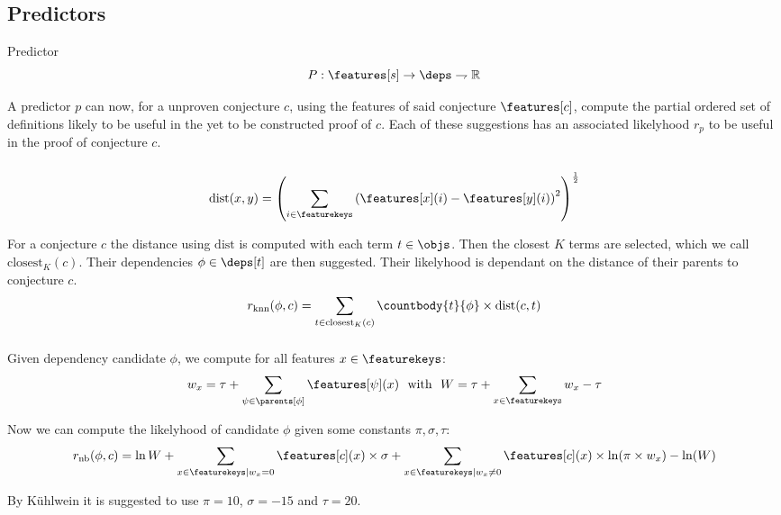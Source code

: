 \subsection{Predictors}

\begin{definition}{Predictor}
	\[ P : \features[s] \rightarrow \deps \rightharpoondown \mathbb{R} \]
\end{definition}

A predictor $p$ can now, for a unproven conjecture $c$,
using the features of said conjecture $\features[c]$,
compute the partial ordered set of definitions likely to be useful in the yet to be constructed proof of $c$.
Each of these suggestions has an associated likelyhood $r_p$ to be useful in the proof of conjecture $c$.

\subsubsection{\knn}
$$ \text{dist}(x, y) = \left( \sum_{i \in \featurekeys} \left( \features[x](i) - \features[y](i) \right)^2 \right)^{\frac{1}{2}} $$

For a conjecture $c$ the distance using $\text{dist}$ is computed with each term $t \in \objs$.
Then the closest $K$ terms are selected, which we call $\text{closest}_K(c)$.
Their dependencies $\phi \in \deps[t]$ are then suggested.
Their likelyhood is dependant on the distance of their parents to conjecture $c$.
\[ r_\text{knn}(\phi, c) = \sum_{t \in \text{closest}_K(c)} \countbody{t}{\phi} \times \text{dist}(c, t) \]

\subsubsection{\nb}

Given dependency candidate $\phi$, we compute for all features $x \in \featurekeys$:
\[
	w_x = \tau + \sum_{\psi \in \parents[\phi]} \features[\psi](x) ~~\text{with}~~ W = \tau + \sum_{x \in \featurekeys} w_x - \tau
\]

Now we can compute the likelyhood of candidate $\phi$ given some constants $\pi, \sigma, \tau$:
\[
	r_\text{nb}(\phi, c) = \ln W +
	\sum_{x \in \featurekeys | w_x = 0} \features[c](x) \times \sigma +
	\sum_{x \in \featurekeys | w_x \neq 0} \features[c](x) \times \ln(\pi \times w_x) - \ln(W)
\]

By K\"uhlwein \cite{kuhlwein2013mash} it is suggested to use $\pi = 10$, $\sigma = -15$ and $\tau = 20$.

